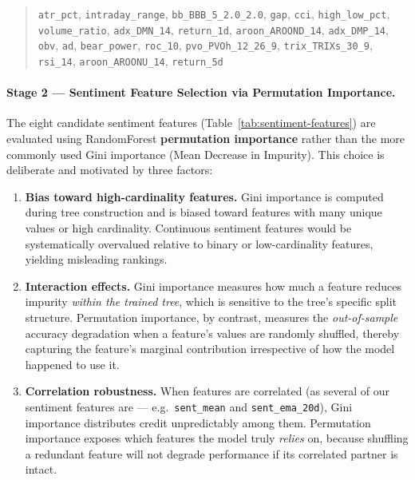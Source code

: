 \begin{quote}\small
\texttt{atr\_pct}, \texttt{intraday\_range}, \texttt{bb\_BBB\_5\_2.0\_2.0},
\texttt{gap}, \texttt{cci}, \texttt{high\_low\_pct}, \texttt{volume\_ratio},
\texttt{adx\_DMN\_14}, \texttt{return\_1d}, \texttt{aroon\_AROOND\_14},
\texttt{adx\_DMP\_14}, \texttt{obv}, \texttt{ad}, \texttt{bear\_power},
\texttt{roc\_10}, \texttt{pvo\_PVOh\_12\_26\_9}, \texttt{trix\_TRIXs\_30\_9},
\texttt{rsi\_14}, \texttt{aroon\_AROONU\_14}, \texttt{return\_5d}
\end{quote}

\paragraph{Stage 2 --- Sentiment Feature Selection via Permutation Importance.}
The eight candidate sentiment features (Table~\ref{tab:sentiment-features}) are
evaluated using RandomForest \textbf{permutation importance} rather than the
more commonly used Gini importance (Mean Decrease in Impurity).  This choice
is deliberate and motivated by three factors:

\begin{enumerate}
  \item \textbf{Bias toward high-cardinality features.}  Gini importance is
        computed during tree construction and is biased toward features with many
        unique values or high cardinality.  Continuous sentiment features would
        be systematically overvalued relative to binary or low-cardinality
        features, yielding misleading rankings.

  \item \textbf{Interaction effects.}  Gini importance measures how much a
        feature reduces impurity \emph{within the trained tree}, which is
        sensitive to the tree's specific split structure.  Permutation importance,
        by contrast, measures the \emph{out-of-sample} accuracy degradation when
        a feature's values are randomly shuffled, thereby capturing the feature's
        marginal contribution irrespective of how the model happened to use it.

  \item \textbf{Correlation robustness.}  When features are correlated (as
        several of our sentiment features are --- e.g.\ \texttt{sent\_mean} and
        \texttt{sent\_ema\_20d}), Gini importance distributes credit
        unpredictably among them.  Permutation importance exposes which features
        the model truly \emph{relies} on, because shuffling a redundant feature
        will not degrade performance if its correlated partner is intact.
\end{enumerate}

